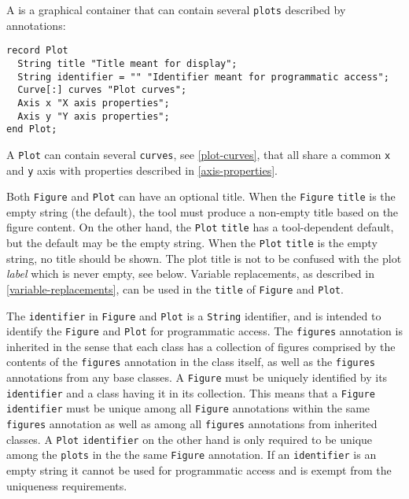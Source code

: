 A  is a graphical container that can contain several \lstinline!plots! described by  annotations:
\begin{lstlisting}[language=modelica]
record Plot
  String title "Title meant for display";
  String identifier = "" "Identifier meant for programmatic access";
  Curve[:] curves "Plot curves";
  Axis x "X axis properties";
  Axis y "Y axis properties";
end Plot;
\end{lstlisting}

A \lstinline!Plot! can contain several \lstinline!curves!, see \cref{plot-curves}, that all share a common \lstinline!x! and \lstinline!y! axis with properties described in \cref{axis-properties}.

Both \lstinline!Figure! and \lstinline!Plot! can have an optional title.
When the \lstinline!Figure! \lstinline!title! is the empty string (the default), the tool must produce a non-empty title based on the figure content.
On the other hand, the \lstinline!Plot! \lstinline!title! has a tool-dependent default, but the default may be the empty string.
When the \lstinline!Plot! \lstinline!title! is the empty string, no title should be shown.
The plot title is not to be confused with the plot \emph{label} which is never empty, see below.
Variable replacements, as described in \cref{variable-replacements}, can be used in the \lstinline!title! of \lstinline!Figure! and \lstinline!Plot!.

The \lstinline!identifier! in \lstinline!Figure! and \lstinline!Plot! is a \lstinline!String! identifier, and is intended to identify the \lstinline!Figure! and \lstinline!Plot! for programmatic access.
The \lstinline!figures! annotation is inherited in the sense that each class has a collection of figures comprised by the contents of the \lstinline!figures! annotation in the class itself, as well as the \lstinline!figures! annotations from any base classes.
A \lstinline!Figure! must be uniquely identified by its \lstinline!identifier! and a class having it in its collection.
This means that a \lstinline!Figure! \lstinline!identifier! must be unique among all \lstinline!Figure! annotations within the same \lstinline!figures! annotation as well as among all \lstinline!figures! annotations from inherited classes.
A \lstinline!Plot! \lstinline!identifier! on the other hand is only required to be unique among the \lstinline!plots! in the the same \lstinline!Figure! annotation.
If an \lstinline!identifier! is an empty string it cannot be used for programmatic access and is exempt from the uniqueness requirements.

